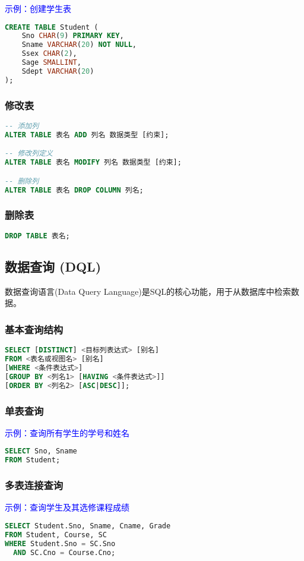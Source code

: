 \documentclass{../../note}
\begin{document}
\textcolor{blue}{示例：创建学生表}
\begin{lstlisting}[language=SQL]
CREATE TABLE Student (
    Sno CHAR(9) PRIMARY KEY,
    Sname VARCHAR(20) NOT NULL,
    Ssex CHAR(2),
    Sage SMALLINT,
    Sdept VARCHAR(20)
);
\end{lstlisting}

\subsubsection{修改表}
\begin{lstlisting}[language=SQL]
-- 添加列
ALTER TABLE 表名 ADD 列名 数据类型 [约束];

-- 修改列定义
ALTER TABLE 表名 MODIFY 列名 数据类型 [约束];

-- 删除列
ALTER TABLE 表名 DROP COLUMN 列名;
\end{lstlisting}

\subsubsection{删除表}
\begin{lstlisting}[language=SQL]
DROP TABLE 表名;
\end{lstlisting}

\subsection{数据查询 (DQL)}
数据查询语言(Data Query Language)是SQL的核心功能，用于从数据库中检索数据。

\subsubsection{基本查询结构}
\begin{lstlisting}[language=SQL]
SELECT [DISTINCT] <目标列表达式> [别名]
FROM <表名或视图名> [别名]
[WHERE <条件表达式>]
[GROUP BY <列名1> [HAVING <条件表达式>]]
[ORDER BY <列名2> [ASC|DESC]];
\end{lstlisting}

\subsubsection{单表查询}
\textcolor{blue}{示例：查询所有学生的学号和姓名}
\begin{lstlisting}[language=SQL]
SELECT Sno, Sname
FROM Student;
\end{lstlisting}

\subsubsection{多表连接查询}
\textcolor{blue}{示例：查询学生及其选修课程成绩}
\begin{lstlisting}[language=SQL]
SELECT Student.Sno, Sname, Cname, Grade
FROM Student, Course, SC
WHERE Student.Sno = SC.Sno
  AND SC.Cno = Course.Cno;
\end{lstlisting}
\end{document}
